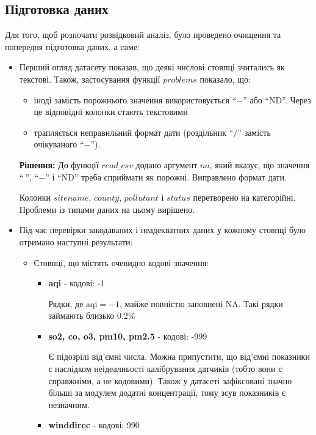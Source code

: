 \documentclass{article}
\begin{document}
\subsection{Підготовка даних}
Для того, щоб розпочати розвідковий аналіз, було проведено очищення та попередня підготовка даних, а саме: 
\begin{itemize}
    \item Перший огляд датасету показав, що деякі числові стовпці зчитались як текстові. 
    Також, застосування функції $problems$ показало, що:
        \begin{itemize}
            \item іноді замість порожнього значення використовується ``$-$'' або ``ND''. Через це відповідні колонки стають текстовими
            \item трапляється неправильний формат дати (роздільник ``$/$'' замість очікуваного ``$-$'').
        \end{itemize}
   \textbf{Рішення:} До функції $read\_csv$ додано аргумент $na$, який вказує, що значення ``$ \ $'', ``$-$'' і ``ND'' треба сприймати як порожні. Виправлено формат дати.
   
   Колонки $sitename$, $county$, $pollutant$ і $status$ перетворено на категорійні. Проблеми із типами даних на цьому вирішено.
   
   \newpage
   
    \item Під час перевірки закодаваних і неадекватних даних у кожному стовпці було отримано наступні результати: 
         \begin{itemize}
             \item Стовпці, що містять очевидно кодові значення:
             \begin{itemize}
                \item \textbf{aqi} - кодові: -1
                
                Рядки, де $\text{aqi} = -1$, майже повністю заповнені NA. Такі рядки займають близько $0.2\%$
                \item \textbf{so2, co, o3, pm10, pm2.5}  - кодові: -999
                
                Є підозрілі від'ємні числа. Можна припустити, що від'ємні показники є наслідком неідеалньості калібрування датчиків (тобто вони є справжніми, а не кодовими). Також у датасеті зафіксовані значно більші за модулем додатні концентрації, тому зсув показників є незначним.
                \item \textbf{winddirec} - кодові: 990
             \end{itemize}
             

\end{itemize}
\end{itemize}
\end{document}
